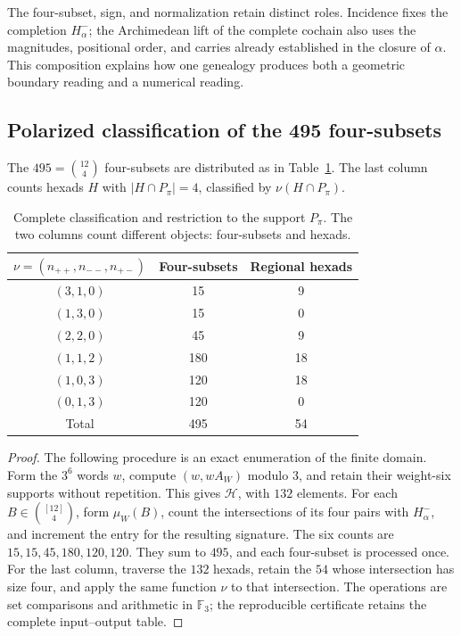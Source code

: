 The four-subset, sign, and normalization retain distinct roles.
Incidence fixes the completion \(H^-_\alpha\); the Archimedean
lift of the complete cochain also uses the magnitudes, positional
order, and carries already established in the closure of
\(\alpha\). This composition explains how one genealogy
produces both a geometric boundary reading and a numerical reading.

\subsection{Polarized classification of the 495 four-subsets}
\label{star27:clasificacion}

\begin{theorem}
\label{star27:censo}
The \(495=\binom{12}{4}\) four-subsets are distributed as
in Table~\ref{star27:tabla-censo}. The last column counts
hexads \(H\) with \(|H\cap P_\pi|=4\), classified by
\(\nu(H\cap P_\pi)\).
\end{theorem}

\begin{table}[htbp]
\centering
\begin{tabular}{ccc}
\toprule
\(\nu=(n_{++},n_{--},n_{+-})\)&Four-subsets&Regional hexads\\
\midrule
\((3,1,0)\)&15&9\\
\((1,3,0)\)&15&0\\
\((2,2,0)\)&45&9\\
\((1,1,2)\)&180&18\\
\((1,0,3)\)&120&18\\
\((0,1,3)\)&120&0\\
\midrule
Total&495&54\\
\bottomrule
\end{tabular}
\caption{Complete classification and restriction to the support
\(P_\pi\). The two columns count different objects: four-subsets
and hexads.}
\label{star27:tabla-censo}
\end{table}

\begin{proof}
The following procedure is an exact enumeration of the finite
domain. Form the \(3^6\) words \(w\), compute \((w,wA_W)\)
modulo \(3\), and retain their weight-six supports without
repetition. This gives \(\mathcal H\), with \(132\) elements.
For each \(B\in\binom{[12]}4\), form \(\mu_W(B)\), count
the intersections of its four pairs with \(H^-_\alpha\),
and increment the entry for the resulting signature. The six
counts are \(15,15,45,180,120,120\). They sum to \(495\),
and each four-subset is processed once. For the last column,
traverse the \(132\) hexads, retain the \(54\) whose
intersection has size four, and apply the same function
\(\nu\) to that intersection. The operations are set
comparisons and arithmetic in \(\mathbb F_3\); the
reproducible certificate retains the complete input--output table.
\end{proof}

